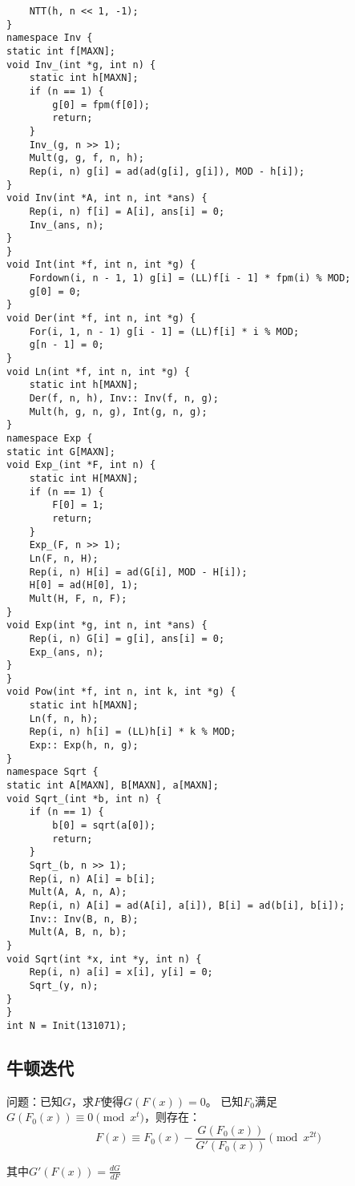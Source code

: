 \documentclass[twocolumn,a4]{article}
\begin{document}
\begin{lstlisting}
    NTT(h, n << 1, -1);
}
namespace Inv {
static int f[MAXN];
void Inv_(int *g, int n) {
    static int h[MAXN];
    if (n == 1) {
        g[0] = fpm(f[0]);
        return;
    }
    Inv_(g, n >> 1);
    Mult(g, g, f, n, h);
    Rep(i, n) g[i] = ad(ad(g[i], g[i]), MOD - h[i]);
}
void Inv(int *A, int n, int *ans) {
    Rep(i, n) f[i] = A[i], ans[i] = 0;
    Inv_(ans, n);
}
}
void Int(int *f, int n, int *g) {
    Fordown(i, n - 1, 1) g[i] = (LL)f[i - 1] * fpm(i) % MOD;
    g[0] = 0;
}
void Der(int *f, int n, int *g) {
    For(i, 1, n - 1) g[i - 1] = (LL)f[i] * i % MOD;
    g[n - 1] = 0;
}
void Ln(int *f, int n, int *g) {
    static int h[MAXN];
    Der(f, n, h), Inv:: Inv(f, n, g);
    Mult(h, g, n, g), Int(g, n, g);
}
namespace Exp {
static int G[MAXN];
void Exp_(int *F, int n) {
    static int H[MAXN];
    if (n == 1) {
        F[0] = 1;
        return;
    }
    Exp_(F, n >> 1);
    Ln(F, n, H);
    Rep(i, n) H[i] = ad(G[i], MOD - H[i]);
    H[0] = ad(H[0], 1);
    Mult(H, F, n, F);
}
void Exp(int *g, int n, int *ans) {
    Rep(i, n) G[i] = g[i], ans[i] = 0;
    Exp_(ans, n);
}
}
void Pow(int *f, int n, int k, int *g) {
    static int h[MAXN];
    Ln(f, n, h);
    Rep(i, n) h[i] = (LL)h[i] * k % MOD;
    Exp:: Exp(h, n, g);
}
namespace Sqrt {
static int A[MAXN], B[MAXN], a[MAXN];
void Sqrt_(int *b, int n) {
    if (n == 1) {
        b[0] = sqrt(a[0]);
        return;
    }
    Sqrt_(b, n >> 1);
    Rep(i, n) A[i] = b[i];
    Mult(A, A, n, A);
    Rep(i, n) A[i] = ad(A[i], a[i]), B[i] = ad(b[i], b[i]);
    Inv:: Inv(B, n, B);
    Mult(A, B, n, b);
}
void Sqrt(int *x, int *y, int n) {
    Rep(i, n) a[i] = x[i], y[i] = 0;
    Sqrt_(y, n);
}
}
int N = Init(131071);
\end{lstlisting}

\subsection{牛顿迭代}
问题：已知$G$，求$F$使得$G(F(x)) = 0$。
已知$F_0$满足$G(F_0(x))\equiv 0 \pmod{x^t}$，则存在：
$$
F(x) \equiv F_0(x) - \frac{G(F_0(x))}{G'(F_0(x))} \pmod {x^{2t}}
$$

其中$G'(F(x)) = \frac{dG}{dF}$
\end{document}

